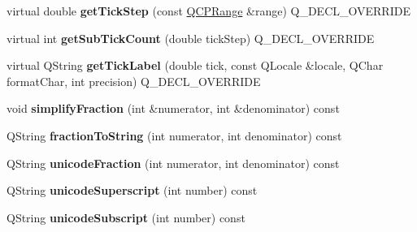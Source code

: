 \begin{DoxyCompactItemize}
\item 
\mbox{\label{class_q_c_p_axis_ticker_pi_a1c7fb37262f89bbd432a5b5799df5778}} 
virtual double {\bfseries get\+Tick\+Step} (const \hyperlink{class_q_c_p_range}{Q\+C\+P\+Range} \&range) Q\+\_\+\+D\+E\+C\+L\+\_\+\+O\+V\+E\+R\+R\+I\+DE
\item 
\mbox{\label{class_q_c_p_axis_ticker_pi_a85b1a9eda8ad2c327bebe0439c4529dc}} 
virtual int {\bfseries get\+Sub\+Tick\+Count} (double tick\+Step) Q\+\_\+\+D\+E\+C\+L\+\_\+\+O\+V\+E\+R\+R\+I\+DE
\item 
\mbox{\label{class_q_c_p_axis_ticker_pi_a77e9a2537bfdf6441c3dc7a4865edd7d}} 
virtual Q\+String {\bfseries get\+Tick\+Label} (double tick, const Q\+Locale \&locale, Q\+Char format\+Char, int precision) Q\+\_\+\+D\+E\+C\+L\+\_\+\+O\+V\+E\+R\+R\+I\+DE
\item 
\mbox{\label{class_q_c_p_axis_ticker_pi_a0e30609aed5025d331cb61671f0115d0}} 
void {\bfseries simplify\+Fraction} (int \&numerator, int \&denominator) const
\item 
\mbox{\label{class_q_c_p_axis_ticker_pi_afb59d434358173eb5b58e41255bea904}} 
Q\+String {\bfseries fraction\+To\+String} (int numerator, int denominator) const
\item 
\mbox{\label{class_q_c_p_axis_ticker_pi_ade6f7e49238e986e9aed74178a78d8d3}} 
Q\+String {\bfseries unicode\+Fraction} (int numerator, int denominator) const
\item 
\mbox{\label{class_q_c_p_axis_ticker_pi_a34798972670b3760d649ccfe0d0ee9a5}} 
Q\+String {\bfseries unicode\+Superscript} (int number) const
\item 
\mbox{\label{class_q_c_p_axis_ticker_pi_a5b3bb340adb888a30a96225e1ca23c7a}} 
Q\+String {\bfseries unicode\+Subscript} (int number) const
\end{DoxyCompactItemize}
